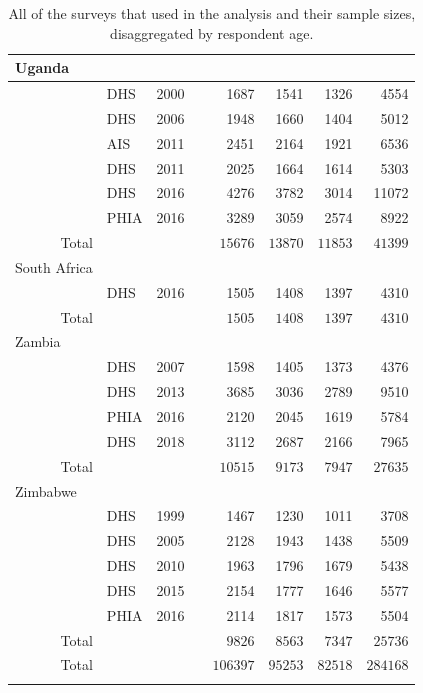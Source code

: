 \documentclass[a4paper, nobind]{templates/ociamthesis}
\newcommand{\cmark}{\ding{51}}
\newcommand{\xmark}{\ding{55}}
\begin{document}
\begin{longtable}{rlrcrrrr}
\midrule
\multicolumn{1}{l}{Uganda} \\ 
\midrule
 & DHS & 2000 & \xmark & 1687 & 1541 & 1326 & 4554 \\ 
 & DHS & 2006 & \xmark & 1948 & 1660 & 1404 & 5012 \\ 
 & AIS & 2011 & \xmark & 2451 & 2164 & 1921 & 6536 \\ 
 & DHS & 2011 & \xmark & 2025 & 1664 & 1614 & 5303 \\ 
 & DHS & 2016 & \cmark & 4276 & 3782 & 3014 & 11072 \\ 
 & PHIA & 2016 & \xmark & 3289 & 3059 & 2574 & 8922 \\ 
\midrule 
Total &  &  &  & $15676$ & $13870$ & $11853$ & $41399$ \\ 
\midrule
\multicolumn{1}{l}{South Africa} \\ 
\midrule
 & DHS & 2016 & \cmark & 1505 & 1408 & 1397 & 4310 \\ 
Total &  &  &  & $1505$ & $1408$ & $1397$ & $4310$ \\ 
\midrule
\multicolumn{1}{l}{Zambia} \\ 
\midrule
 & DHS & 2007 & \xmark & 1598 & 1405 & 1373 & 4376 \\ 
 & DHS & 2013 & \xmark & 3685 & 3036 & 2789 & 9510 \\ 
 & PHIA & 2016 & \cmark & 2120 & 2045 & 1619 & 5784 \\ 
 & DHS & 2018 & \cmark & 3112 & 2687 & 2166 & 7965 \\ 
Total &  &  &  & $10515$ & $9173$ & $7947$ & $27635$ \\ 
\midrule
\multicolumn{1}{l}{Zimbabwe} \\ 
\midrule
 & DHS & 1999 & \xmark & 1467 & 1230 & 1011 & 3708 \\ 
 & DHS & 2005 & \xmark & 2128 & 1943 & 1438 & 5509 \\ 
 & DHS & 2010 & \xmark & 1963 & 1796 & 1679 & 5438 \\ 
 & DHS & 2015 & \cmark & 2154 & 1777 & 1646 & 5577 \\ 
 & PHIA & 2016 & \cmark & 2114 & 1817 & 1573 & 5504 \\ 
Total &  &  &  & $9826$ & $8563$ & $7347$ & $25736$ \\ 
\midrule 
\midrule 
Total &  &  &  & $106397$ & $95253$ & $82518$ & $284168$ \\ 
\bottomrule
\caption{All of the surveys that used in the analysis and their sample sizes, disaggregated by respondent age.}
\label{tab:surveys-used}
\end{longtable}
\end{document}
